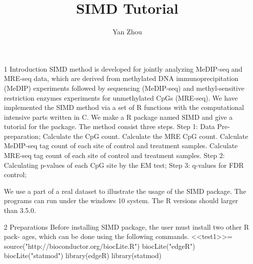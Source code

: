 \documentclass{article}
\title{SIMD Tutorial}
\author{Yan Zhou}
\begin{document}

\maketitle

1 Introduction
SIMD method is developed for jointly analyzing MeDIP-seq and MRE-seq data,
which are derived from methylated DNA immunoprecipitation (MeDIP) experiments
followed by sequencing (MeDIP-seq) and methyl-sensitive restriction enzymes
experiments for unmethylated CpGs (MRE-seq). We have implemented the
SIMD method via a set of R functions with the computational intensive parts
written in C. We make a R package named SIMD and give a tutorial for
the package. The method consist three steps.
Step 1: Data Pre-preparation;
  Calculate the CpG count.
  Calculate the MRE CpG count.
  Calculate MeDIP-seq tag count of each site of control and treatment
samples.
  Calculate MRE-seq tag count of each site of control and treatment
samples.
Step 2: Calculating p-values of each CpG site by the EM test;
Step 3: q-values for FDR control;

We use a part of a real dataset to illustrate the usage of the SIMD package.
The programs can run under the windows 10 system. The
R versions should larger than 3.5.0.

2 Preparations
Before installing SIMD package, the user must install two other R pack-
ages, which can be done using the following commands.
  <<test1>>=
source("http://bioconductor.org/biocLite.R")
biocLite("edgeR")
biocLite("statmod")
library(edgeR)
library(statmod)
\end{document}
